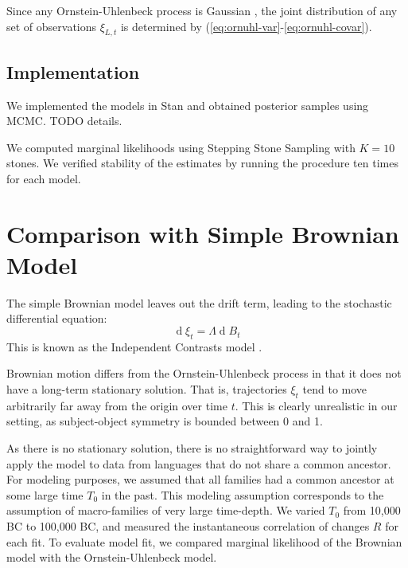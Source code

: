 \documentclass[11pt,a4paper]{article}
\begin{document}
Since any Ornstein-Uhlenbeck process is Gaussian \citep{schach1971weak}, the joint distribution of any set of observations $\xi_{L, t}$ is determined by (\ref{eq:ornuhl-var}-\ref{eq:ornuhl-covar}).

\subsection{Implementation}

We implemented the models in Stan and obtained posterior samples using MCMC. TODO details.

We computed marginal likelihoods using Stepping Stone Sampling with $K=10$ stones.
We verified stability of the estimates by running the procedure ten times for each model.




\section{Comparison with Simple Brownian Model}

The simple Brownian model leaves out the drift term, leading to the stochastic differential equation:
\begin{equation*}
    \operatorname{d}\xi_t = \Lambda \operatorname{d}B_t
\end{equation*}
This is known as the Independent Contrasts model \citep{felsenstein1973maximum}.

Brownian motion differs from the Ornstein-Uhlenbeck process in that it does not have a long-term stationary solution.
That is, trajectories $\xi_t$ tend to move arbitrarily far away from the origin over time $t$.
This is clearly unrealistic in our setting, as subject-object symmetry is bounded between 0 and 1.

As there is no stationary solution, there is no straightforward way to jointly apply the model to data from languages that do not share a common ancestor.
For modeling purposes, we assumed that all families had a common ancestor at some large time $T_0$ in the past.
This modeling assumption corresponds to the assumption of macro-families of very large time-depth.
We varied $T_0$ from 10,000 BC to 100,000 BC, and measured the instantaneous correlation of changes $R$ for each fit.
To evaluate model fit, we compared marginal likelihood of the Brownian model with the Ornstein-Uhlenbeck model.
\end{document}
